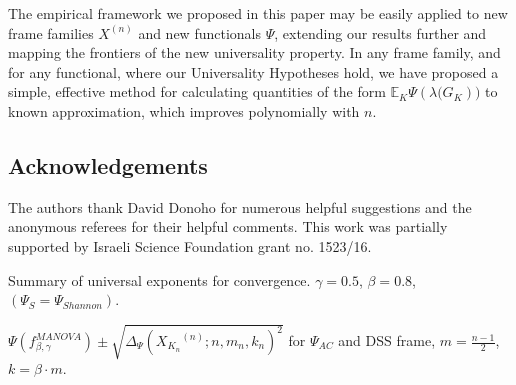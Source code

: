 \documentclass[a4paper,12pt]{article}
\newcommand{\E}{\ensuremath{\mathbb{E}}}
\newcommand{\m}{m}
\newcommand{\specstat}{\ensuremath{\Psi}}
\newcommand{\Xkn}{\ensuremath{X_{K_n}}}
\begin{document}
The empirical framework we proposed in this paper may be easily applied to new
frame families $X^{(n)}$ and new functionals $\Psi$, extending our results further and
mapping the frontiers of the new universality property. 
In any frame family, and for any functional, where our Universality Hypotheses hold, we
have proposed a simple, effective method for calculating quantities of the form 
$\E_K \Psi\left( \lambda(G_K \right))$ to known approximation, which improves
	polynomially with $n$. 








	\subsection*{Acknowledgements} 
	The authors thank David Donoho for numerous helpful suggestions and the anonymous referees for their helpful comments. 
This work was partially supported by Israeli Science Foundation grant no.
1523/16.



%


\begin{sidewaystable}[htb]
   \centering

\caption{Summary of universal exponents for convergence. $\gamma = 0.5$, $\beta = 0.8$, $(\specstat_{S}=\specstat_{Shannon})$.
\label{ExpSummary}
}
\end{sidewaystable}

\begin{sidewaystable}[htb]
		\centering

\caption{$\Psi(f^{MANOVA}_{\beta,\gamma})\pm\sqrt{\Delta_\specstat(\Xkn^{(n)};n,\m_n,k_n)^2}$ for $\specstat_{AC}$ and DSS frame, $m=\frac{n-1}{2}$, $k=\beta\cdot\m$.
  }
		\label{TabulateAccuracy}
	\end{sidewaystable}




\clearpage
\end{document}
